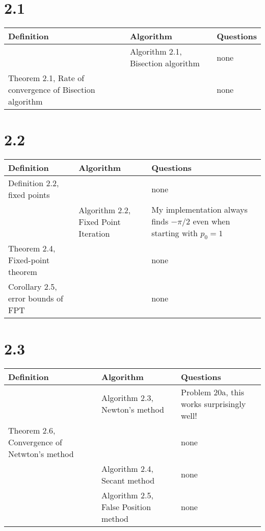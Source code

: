 \documentclass{article}
\begin{document}
\section*{2.1}

\begin{tabularx}{\textwidth}{ |X|X|X| }
    \hline
	{\bf Definition} & {\bf Algorithm} & {\bf Questions} \\
    \hline
	 & Algorithm 2.1, Bisection algorithm & none \\
    \hline
	Theorem 2.1, Rate of convergence of Bisection algorithm & & none \\
    \hline
\end{tabularx}

\section*{2.2}

\begin{tabularx}{\textwidth}{ |X|X|X| }
    \hline
	{\bf Definition} & {\bf Algorithm} & {\bf Questions} \\
    \hline
	Definition 2.2, fixed points & & none \\
    \hline
	 & Algorithm 2.2, Fixed Point Iteration & My implementation always finds $-\pi/2$ even when starting with $p_0=1$ \\
    \hline
	Theorem 2.4, Fixed-point theorem & & none \\
    \hline
	Corollary 2.5, error bounds of FPT & & none \\
    \hline
\end{tabularx}

\section*{2.3}

\begin{tabularx}{\textwidth}{ |X|X|X| }
    \hline
	{\bf Definition} & {\bf Algorithm} & {\bf Questions} \\
    \hline
	 & Algorithm 2.3, Newton's method & Problem 20a, this works surprisingly well! \\
    \hline
	Theorem 2.6, Convergence of Netwton's method & & none \\
    \hline
	 & Algorithm 2.4, Secant method & none \\
    \hline
	 & Algorithm 2.5, False Position method & none \\
    \hline
\end{tabularx}
\end{document}
